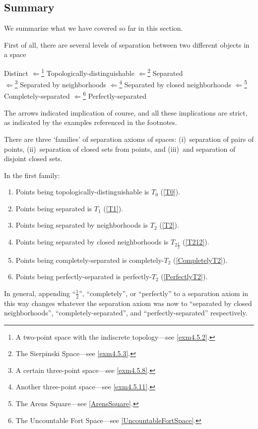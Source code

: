 \subsection{Summary}

We summarize what we have covered so far in this section.

First of all, there are several levels of separation between two different objects in a space
\begin{displayquote}
Distinct $\Leftarrow$\footnote{A two-point space with the indiscrete topology---see \cref{exm4.5.2}.} Topologically-distinguishable $\Leftarrow$\footnote{The Sierpinski Space---see \cref{exm4.5.3}.} Separated \\ $\Leftarrow$\footnote{A certain three-point space---see \cref{exm4.5.8}.} Separated by neighborhoods $\Leftarrow$\footnote{Another three-point space---see \cref{exm4.5.11}.} Separated by closed neighborhoods $\Leftarrow$\footnote{The Arens Square---see \cref{ArensSquare}.} Completely-separated $\Leftarrow$\footnote{The Uncountable Fort Space---see \cref{UncountableFortSpace}.} Perfectly-separated
\end{displayquote}
The arrows indicated implication of course, and all these implications are strict, as indicated by the examples referenced in the footnotes.

There are three `families' of separation axioms of spaces:  (i)~separation of pairs of points, (ii)~separation of closed sets from points, and (iii)~and separation of disjoint closed sets.

In the first family:
\begin{enumerate}
\item Points being topologically-distinguishable is $T_0$ (\cref{T0}).
\item Points being separated is $T_1$ (\cref{T1}).
\item Points being separated by neighborhoods is $T_2$ (\cref{T2}).
\item Points being separated by closed neighborhoods is $T_{2\frac{1}{2}}$ (\cref{T212}).
\item Points being completely-separated is completely-$T_2$ (\cref{CompletelyT2}).
\item Points being perfectly-separated is perfectly-$T_2$ (\cref{PerfectlyT2}).
\end{enumerate}
In general, appending ``$\frac{1}{2}$'', ``completely'', or ``perfectly'' to a separation axiom in this way changes whatever the separation axiom was now to ``separated by closed neighborhoods'', ``completely-separated'', and ``perfectly-separated'' respectively.

